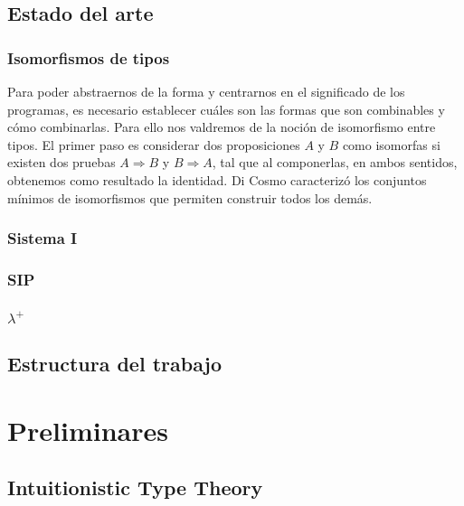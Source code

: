 \documentclass[]{report}
\begin{document}
\section{Estado del arte}
\subsection{Isomorfismos de tipos}

Para poder abstraernos de la forma y centrarnos en el significado de los
programas, es necesario establecer cuáles son las formas que son combinables
y cómo combinarlas. Para ello nos valdremos de la noción de isomorfismo
entre tipos. El primer paso es considerar dos proposiciones $A$ y $B$ como isomorfas si existen dos pruebas $A \Rightarrow B$ y $B \Rightarrow A$, tal que al componerlas, en ambos sentidos, obtenemos como resultado la identidad. Di Cosmo \cite{dicosmo} caracterizó los conjuntos mínimos de isomorfismos que permiten construir todos los demás.


\subsection{Sistema I}

\subsection{SIP}

\subsection{$\lambda^+$}

\section{Estructura del trabajo}

\chapter{Preliminares}

\section{Intuitionistic Type Theory}
\end{document}
